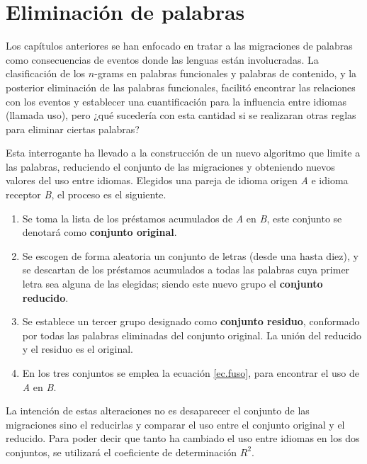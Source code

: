 \chapter{Eliminación de palabras}


Los capítulos anteriores se han enfocado en tratar a las migraciones de palabras como consecuencias de eventos donde  las lenguas están involucradas. La clasificación de los $n$-grams en palabras funcionales y palabras de contenido, y la posterior eliminación de las palabras funcionales, facilitó encontrar las relaciones con los eventos y establecer una cuantificación para la influencia entre idiomas (llamada uso), pero ¿qué sucedería con esta cantidad si se realizaran otras reglas para eliminar ciertas palabras?

Esta interrogante ha llevado a la construcción de un nuevo algoritmo que limite a las palabras,  reduciendo el conjunto de las migraciones y obteniendo nuevos valores del uso entre idiomas.  Elegidos una pareja de idioma origen \textit{A} e idioma receptor \textit{B}, el proceso es el siguiente. 


\begin{enumerate}
	
	\item Se toma la lista de los préstamos acumulados de \textit{A} en \textit{B},  este conjunto se denotará como \textbf{conjunto original}.
		
	\item Se escogen de forma aleatoria un conjunto de letras (desde una hasta diez), y se descartan de los préstamos acumulados a todas las palabras cuya primer letra sea alguna de las elegidas; siendo este nuevo grupo el \textbf{conjunto reducido}.
	
	\item Se establece un tercer grupo designado como \textbf{conjunto residuo}, conformado por todas las palabras eliminadas del conjunto original.  La unión del reducido y el residuo es el original. 
	
	\item En los tres conjuntos se emplea la ecuación \ref{ec.fuso}, para encontrar el uso de \textit{A} en \textit{B}. 	
	 
\end{enumerate}

La intención de estas alteraciones no es desaparecer el conjunto de las migraciones sino el reducirlas  y comparar el uso entre el conjunto original y el reducido.  Para poder decir que tanto ha cambiado el uso entre idiomas en los dos conjuntos, se utilizará el coeficiente de determinación $R^{2}$. 

